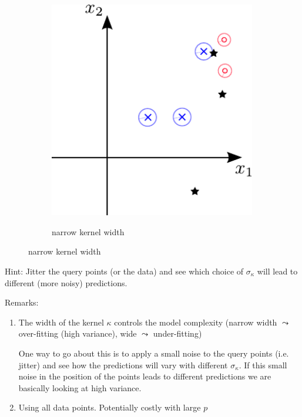\begin{frame}
\begin{figure}[ht]
\begin{subfigure}[t]{0.37\textwidth}
{         \includegraphics[width=0.99\textwidth]{img/parzen_circles_narrow}
         }
         \caption{narrow kernel width}
         \label{fig:linear}
     \end{subfigure}
\end{figure}


\pause

Hint: Jitter the query points (or the data) and see which choice of $\sigma_{\kappa}$ will lead to different (more noisy) predictions.

\end{frame}

\begin{frame}

Remarks:
\begin{enumerate} 
\item The width of the kernel $\kappa$ controls the model complexity (narrow width $\leadsto$ over-fitting (high variance), wide $\leadsto$ under-fitting)
 
One way to go about this is to apply a small noise to the query points (i.e. jitter) and see how the predictions will vary with different $\sigma_{\kappa}$. If this small noise in the position of the points leads to different predictions we are basically looking at high variance.

\item Using all data points. Potentially costly with large $p$
\end{enumerate}
\end{frame}
